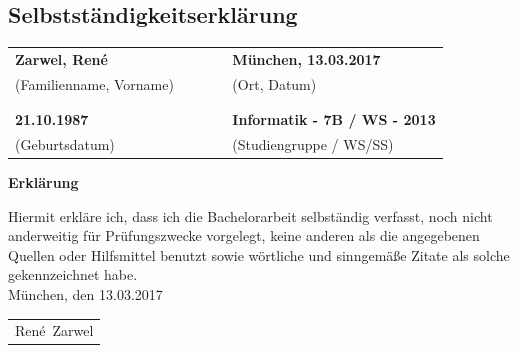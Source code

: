 \documentclass[12pt,a4paper,bibliography=totocnumbered,listof=totocnumbered]{scrartcl}
\numberwithin{figure}{section} %
\begin{document}
\todototoc
\listoftodos
\pagebreak
\begin{appendix}
\setcounter{page}{1}

\thispagestyle{empty}
\section*{Selbstständigkeitserklärung}
{}

\vspace{2cm}
\begin{table}[!h]
	\centering
	\begin{tabular}{p{0.5\linewidth}p{0.5\linewidth}}
		\textbf{Zarwel, René} & \textbf{München, 13.03.2017} \\ 
		(Familienname, Vorname) & (Ort, Datum)\\
		\\ \\
		\textbf{21.10.1987} & \textbf{Informatik - 7B / WS - 2013} \\ 
		(Geburtsdatum) & (Studiengruppe / WS/SS)\\
	\end{tabular} 
\end{table}
\vspace{2cm}

\begin{center}
	\Large
	\textbf{Erklärung}
\end{center}

\vspace{1cm}
Hiermit erkläre ich, dass ich die Bachelorarbeit selbständig verfasst, noch nicht anderweitig für Prüfungszwecke vorgelegt, keine anderen als die angegebenen Quellen oder Hilfsmittel benutzt sowie wörtliche und sinngemäße Zitate als solche gekennzeichnet habe.\\[4ex]

München, den 13.03.2017\\[6ex]
\flushleft
\newlength\us
\settowidth{\us}{-René~Zarwel-}
\begin{tabular}{p{\us}}\hline
	\centering\footnotesize René~Zarwel
\end{tabular}
\pagebreak

\end{appendix}
\end{document}
